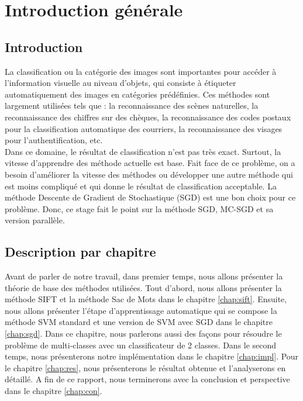\chapter{Introduction générale}

\section{Introduction}

La classification ou la catégorie des images sont importantes pour accéder à l'information visuelle au niveau d'objets, qui consiste à étiqueter automatiquement des images en catégories prédéfinies. Ces méthodes sont largement utilisées tels que : la reconnaissance des scènes naturelles, la reconnaissance des chiffres sur des chèques, la reconnaissance des codes postaux pour la classification automatique des courriers, la reconnaissance des visages pour l'authentification, etc.\\

Dans ce domaine, le résultat de classification n'est pas très exact. Surtout, la vitesse d'apprendre des méthode actuelle est base. Fait face de ce problème, on a besoin d'améliorer la vitesse des méthodes ou développer une autre méthode qui est moins compliqué et qui donne le résultat de classification acceptable. La méthode Descente de Gradient de Stochastique (SGD) est une bon choix pour ce problème. Donc, ce stage fait le point sur la méthode SGD, MC-SGD et sa version parallèle.

\section{Description par chapitre}

Avant de parler de notre travail, dans premier temps, nous allons présenter la théorie de base des méthodes utilisées. Tout d'abord, nous allons présenter la méthode SIFT et la méthode Sac de Mots dans le chapitre \ref{chap:sift}. Ensuite, nous allons présenter l'étape d'apprentissage automatique qui se compose la méthode SVM standard et une version de SVM avec SGD dans le chapitre \ref{chap:sgd}. Dans ce chapitre, nous parlerons aussi des façons pour résoudre le problème de multi-classes avec un classificateur de 2 classes. Dans le second temps, nous présenterons notre implémentation dans le chapitre \ref{chap:impl}. Pour le chapitre \ref{chap:res}, nous présenterons le résultat obtenue et l'analyserons en détaillé. A fin de ce rapport, nous terminerons avec la conclusion et perspective dans le chapitre \ref{chap:con}.